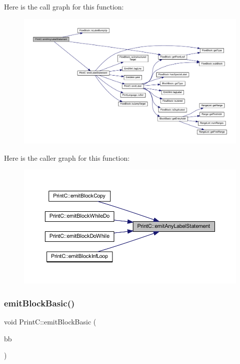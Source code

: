 Here is the call graph for this function\+:
\nopagebreak
\begin{figure}[H]
\begin{center}
\leavevmode
\includegraphics[width=350pt]{class_print_c_a949cd93dbebadf75fad1befc87776285_cgraph}
\end{center}
\end{figure}
Here is the caller graph for this function\+:
\nopagebreak
\begin{figure}[H]
\begin{center}
\leavevmode
\includegraphics[width=350pt]{class_print_c_a949cd93dbebadf75fad1befc87776285_icgraph}
\end{center}
\end{figure}
\mbox{\label{class_print_c_a41db7dd22ab2045a63adb7cd5ad1cfdb}} 
\subsubsection{\texorpdfstring{emitBlockBasic()}{emitBlockBasic()}}
{\footnotesize\ttfamily void Print\+C\+::emit\+Block\+Basic (\begin{DoxyParamCaption}\item[{const \mbox{\hyperlink{class_block_basic}{Block\+Basic}} $\ast$}]{bb }\end{DoxyParamCaption})\hspace{0.3cm}{\ttfamily [virtual]}}



